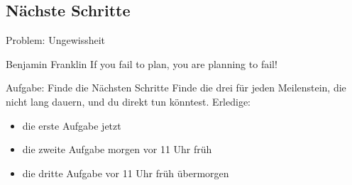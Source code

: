 %
%
%
%
%
%
%


\subsection{Nächste Schritte}


\begin{frame}[c]{Problem: Ungewissheit}
    \large
    \begin{aquote}{Benjamin Franklin}
        If you fail to plan, you are planning to fail!
    \end{aquote}
\end{frame}



\begin{frame}[c]
    \begin{block}{Aufgabe: Finde die Nächsten Schritte}
        Finde die drei  für jeden Meilenstein, die nicht lang
        dauern, und du direkt tun könntest. Erledige:
        \begin{itemize}
            \item die erste Aufgabe jetzt
            \item die zweite Aufgabe morgen vor 11 Uhr früh
            \item die dritte Aufgabe vor 11 Uhr früh übermorgen
        \end{itemize}
    \end{block}
\end{frame}


